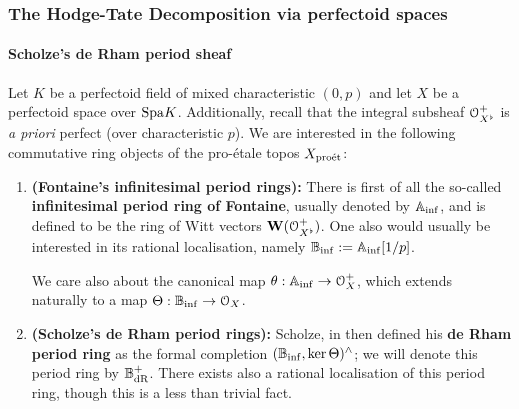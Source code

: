             \subsubsection{The Hodge-Tate Decomposition via perfectoid spaces}
                \paragraph{Scholze's de Rham period sheaf}
                    \begin{definition} \label{def: de_rham_period_sheaves}
                        Let $K$ be a perfectoid field of mixed characteristic $(0, p)$ and let $X$ be a perfectoid space over $\mathrm{Spa} K$. Additionally, recall that the integral subsheaf $\mathcal{O}_{X^{\flat}}^+$ is \textit{a priori} perfect (over characteristic $p$). We are interested in the following commutative ring objects of the pro-\'etale topos $X_{\mathrm{pro\acute{e}t}}$:
                            \begin{enumerate}
                                \item \textbf{(Fontaine's infinitesimal period rings):} There is first of all the so-called \textbf{infinitesimal period ring of Fontaine}, usually denoted by $\mathbb{A}_{\inf}$, and is defined to be the ring of Witt vectors $\mathbf{W}(\mathcal{O}_{X^{\flat}}^+)$. One also would usually be interested in its rational localisation, namely $\mathbb{B}_{\inf} := \mathbb{A}_{\inf}[1/p]$. 
                                
                                We care also about the canonical map $\theta: \mathbb{A}_{\inf} \to \mathcal{O}_X^+$, which extends naturally to a map $\Theta: \mathbb{B}_{\inf} \to \mathcal{O}_X$.
                                \item \textbf{(Scholze's de Rham period rings):} Scholze, in \cite[Definition 6.1]{scholze2012padic} then defined his \textbf{de Rham period ring} as the formal completion $(\mathbb{B}_{\inf}, \ker \Theta)^{\wedge}$; we will denote this period ring by $\mathbb{B}_{\mathrm{dR}}^+$. There exists also a rational localisation of this period ring, though this is a less than trivial fact.
                            \end{enumerate}
                    \end{definition}
                    
